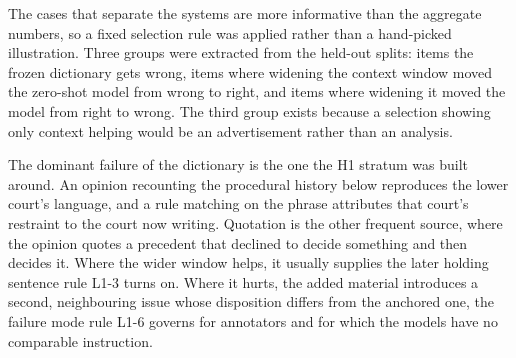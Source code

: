 The cases that separate the systems are more informative than the aggregate
numbers, so a fixed selection rule was applied rather than a hand-picked
illustration. Three groups were extracted from the held-out splits: items the
frozen dictionary gets wrong, items where widening the context window moved the
zero-shot model from wrong to right, and items where widening it moved the model
from right to wrong. The third group exists because a selection showing only
context helping would be an advertisement rather than an analysis.



The dominant failure of the dictionary is the one the H1 stratum was built
around. An opinion recounting the procedural history below reproduces the lower
court's language, and a rule matching on the phrase attributes that court's
restraint to the court now writing. Quotation is the other frequent source, where
the opinion quotes a precedent that declined to decide something and then decides
it. Where the wider window helps, it usually supplies the later holding sentence
rule L1-3 turns on. Where it hurts, the added material introduces a second,
neighbouring issue whose disposition differs from the anchored one, the failure
mode rule L1-6 governs for annotators and for which the models have no comparable
instruction.
